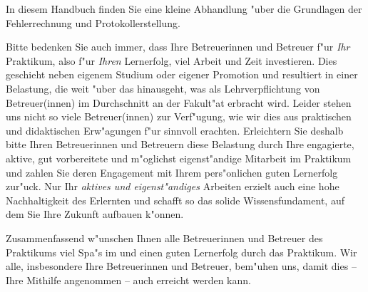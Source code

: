 
In diesem Handbuch finden Sie eine kleine Abhandlung "uber die
Grundlagen der Fehlerrechnung und Protokollerstellung. 

Bitte bedenken Sie auch immer, dass Ihre Betreuerinnen und Betreuer
f"ur \emph{Ihr} Praktikum, also f"ur \emph{Ihren} Lernerfolg, viel
Arbeit und Zeit investieren. Dies geschieht neben eigenem Studium
oder eigener Promotion und resultiert in einer Belastung, die weit
"uber das hinausgeht, was als Lehrverpflichtung von Betreuer(innen)
im Durchschnitt an der Fakult"at erbracht wird. Leider
stehen uns nicht so viele Betreuer(innen) zur Verf"ugung, wie wir dies aus
praktischen und didaktischen Erw"agungen f"ur sinnvoll erachten.
Erleichtern Sie deshalb bitte Ihren Betreuerinnen und Betreuern
diese Belastung durch Ihre engagierte, aktive, gut vorbereitete und
m"oglichst eigenst"andige Mitarbeit im Praktikum und
\glqq{}zahlen\grqq{} Sie deren Engagement mit Ihrem pers"onlichen
guten Lernerfolg zur"uck. Nur Ihr \emph{aktives und eigenst"andiges}
Arbeiten erzielt auch eine hohe Nachhaltigkeit des Erlernten und
schafft so das solide Wissensfundament, auf dem Sie Ihre Zukunft
aufbauen k"onnen.

Zusammenfassend w"unschen Ihnen alle Betreuerinnen und Betreuer des
Praktikums viel Spa"s im und einen guten Lernerfolg durch das
Praktikum. Wir alle, insbesondere Ihre Betreuerinnen und Betreuer,
bem"uhen uns, damit dies -- Ihre Mithilfe angenommen -- auch erreicht
werden kann.


